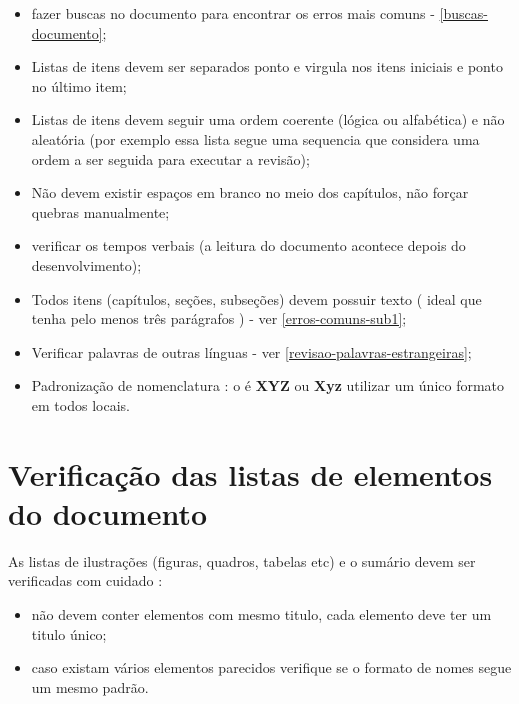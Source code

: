 \begin{itemize}
    \item fazer buscas no documento para encontrar os erros mais comuns - \autoref{buscas-documento};
    
    \item Listas de itens devem ser separados ponto e virgula nos itens iniciais e ponto no último item;
    
    \item Listas de itens devem seguir uma ordem coerente (lógica ou alfabética) e não aleatória (por exemplo essa lista segue uma sequencia que considera uma ordem a ser seguida para executar a revisão);
    
    \item Não devem existir espaços em branco no meio dos capítulos, não forçar quebras manualmente;
    
    \item verificar os tempos verbais (a leitura do documento acontece depois do desenvolvimento);
    
    \item Todos itens (capítulos, seções, subseções) devem possuir texto ( ideal que tenha pelo menos três parágrafos ) - ver \autoref{erros-comuns-sub1};

    \item Verificar palavras de outras línguas - ver \autoref{revisao-palavras-estrangeiras};
    
    \item Padronização de nomenclatura : o é \textbf{XYZ} ou \textbf{Xyz} utilizar um único formato em todos locais.
    
\end{itemize}

\section{Verificação das listas de elementos do documento}
\label{revisao-listas}

As listas de ilustrações (figuras, quadros, tabelas etc) e o sumário devem ser verificadas com cuidado :

\begin{itemize}
    \item não devem conter elementos com mesmo titulo, cada elemento deve ter um titulo único;
    
    \item caso existam vários elementos parecidos verifique se o formato de nomes segue um mesmo padrão.
    
\end{itemize}

